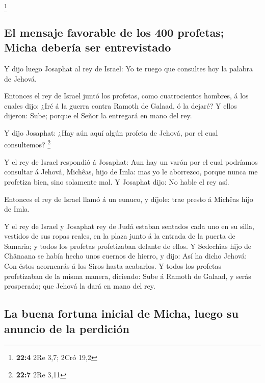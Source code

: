 \footnote{\textbf{22:4} 2Re 3,7; 2Cró 19,2}

\hypertarget{el-mensaje-favorable-de-los-400-profetas-micha-deberuxeda-ser-entrevistado}{%
\subsection{El mensaje favorable de los 400 profetas; Micha debería ser
entrevistado}\label{el-mensaje-favorable-de-los-400-profetas-micha-deberuxeda-ser-entrevistado}}

 Y dijo luego Josaphat al rey de Israel: Yo te ruego que
consultes hoy la palabra de Jehová.

 Entonces el rey de Israel juntó los profetas, como
cuatrocientos hombres, á los cuales dijo: ¿Iré á la guerra contra Ramoth
de Galaad, ó la dejaré? Y ellos dijeron: Sube; porque el Señor la
entregará en mano del rey.

 Y dijo Josaphat: ¿Hay aún aquí algún profeta de Jehová,
por el cual consultemos? \footnote{\textbf{22:7} 2Re 3,11}

 Y el rey de Israel respondió á Josaphat: Aun hay un varón
por el cual podríamos consultar á Jehová, Michêas, hijo de Imla: mas yo
le aborrezco, porque nunca me profetiza bien, sino solamente mal. Y
Josaphat dijo: No hable el rey así.

 Entonces el rey de Israel llamó á un eunuco, y díjole:
trae presto á Michêas hijo de Imla.

 Y el rey de Israel y Josaphat rey de Judá estaban
sentados cada uno en su silla, vestidos de sus ropas reales, en la plaza
junto á la entrada de la puerta de Samaria; y todos los profetas
profetizaban delante de ellos.  Y Sedechîas hijo de
Chânaana se había hecho unos cuernos de hierro, y dijo: Así ha dicho
Jehová: Con éstos acornearás á los Siros hasta acabarlos.
 Y todos los profetas profetizaban de la misma manera,
diciendo: Sube á Ramoth de Galaad, y serás prosperado; que Jehová la
dará en mano del rey.

\hypertarget{la-buena-fortuna-inicial-de-micha-luego-su-anuncio-de-la-perdiciuxf3n}{%
\subsection{La buena fortuna inicial de Micha, luego su anuncio de la
perdición}\label{la-buena-fortuna-inicial-de-micha-luego-su-anuncio-de-la-perdiciuxf3n}}

